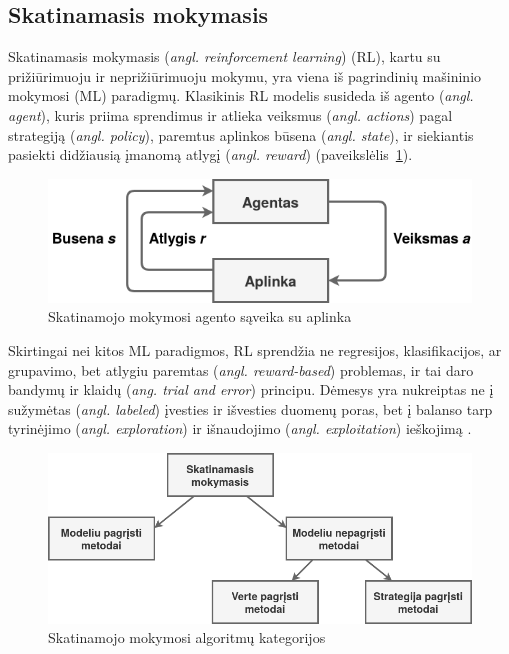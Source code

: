 \documentclass{VUMIFPSbakalaurinis}
\begin{document}
\subsection{Skatinamasis mokymasis}\label{subsec:RL} 
{
	Skatinamasis mokymasis (\textit{angl. reinforcement learning}) (RL), kartu su prižiūrimuoju ir neprižiūrimuoju mokymu, yra viena iš pagrindinių mašininio mokymosi (ML) paradigmų. Klasikinis RL modelis susideda iš agento (\textit{angl. agent}), kuris priima sprendimus ir atlieka veiksmus (\textit{angl. actions}) pagal strategiją  (\textit{angl. policy}), paremtus aplinkos būsena (\textit{angl. state}), ir siekiantis pasiekti didžiausią įmanomą atlygį (\textit{angl. reward}) (paveikslėlis~\ref{img:rl}).\par
	
	\begin{figure}[H]
		\centering
		\includegraphics[scale=0.5]{img/rl}
		\caption{Skatinamojo mokymosi agento sąveika su aplinka}
		\label{img:rl}
	\end{figure} 
	
	Skirtingai nei kitos ML paradigmos, RL sprendžia ne regresijos, klasifikacijos, ar grupavimo, bet atlygiu paremtas (\textit{angl. reward-based}) problemas, ir tai daro bandymų ir klaidų (\textit{ang. trial and error}) principu. Dėmesys yra nukreiptas ne į sužymėtas (\textit{angl. labeled}) įvesties ir išvesties duomenų poras, bet į balanso tarp tyrinėjimo (\textit{angl. exploration}) ir išnaudojimo (\textit{angl. exploitation}) ieškojimą \cite{kaelbling_littman_moore}.\par
	
	\begin{figure}[H]
		\centering
		\includegraphics[scale=0.5]{img/rl_overview}
		\caption{Skatinamojo mokymosi algoritmų kategorijos}
		\label{img:rl_overview}
	\end{figure} 
	
}
\end{document}
